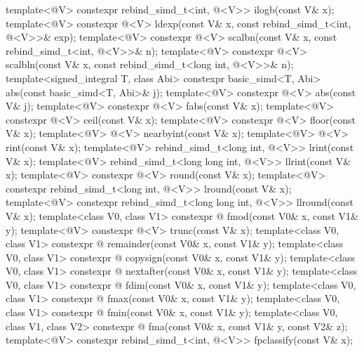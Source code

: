 \begin{itemdecl}
template<@\mathfloatingpoint@ V> constexpr rebind_simd_t<int, @\deducedsimd@<V>> ilogb(const V& x);
template<@\mathfloatingpoint@ V> constexpr @\deducedsimd@<V> ldexp(const V& x, const
rebind_simd_t<int, @\deducedsimd@<V>>& exp);
template<@\mathfloatingpoint@ V> constexpr @\deducedsimd@<V> scalbn(const V& x, const
rebind_simd_t<int, @\deducedsimd@<V>>& n);
template<@\mathfloatingpoint@ V>
  constexpr @\deducedsimd@<V> scalbln(const V& x, const rebind_simd_t<long int, @\deducedsimd@<V>>& n);
template<signed_integral T, class Abi>
  constexpr basic_simd<T, Abi> abs(const basic_simd<T, Abi>& j);
template<@\mathfloatingpoint@ V> constexpr @\deducedsimd@<V> abs(const V& j);
template<@\mathfloatingpoint@ V> constexpr @\deducedsimd@<V> fabs(const V& x);
template<@\mathfloatingpoint@ V> constexpr @\deducedsimd@<V> ceil(const V& x);
template<@\mathfloatingpoint@ V> constexpr @\deducedsimd@<V> floor(const V& x);
template<@\mathfloatingpoint@ V> @\deducedsimd@<V> nearbyint(const V& x);
template<@\mathfloatingpoint@ V> @\deducedsimd@<V> rint(const V& x);
template<@\mathfloatingpoint@ V> rebind_simd_t<long int, @\deducedsimd@<V>> lrint(const V& x);
template<@\mathfloatingpoint@ V> rebind_simd_t<long long int, @\deducedsimd@<V>> llrint(const V& x);
template<@\mathfloatingpoint@ V> constexpr @\deducedsimd@<V> round(const V& x);
template<@\mathfloatingpoint@ V> constexpr rebind_simd_t<long int, @\deducedsimd@<V>> lround(const V& x);
template<@\mathfloatingpoint@ V> constexpr rebind_simd_t<long long int, @\deducedsimd@<V>> llround(const V& x);
template<class V0, class V1>
  constexpr @ fmod(const V0& x, const V1& y);
template<@\mathfloatingpoint@ V> constexpr @\deducedsimd@<V> trunc(const V& x);
template<class V0, class V1>
  constexpr @ remainder(const V0& x, const V1& y);
template<class V0, class V1>
  constexpr @ copysign(const V0& x, const V1& y);
template<class V0, class V1>
  constexpr @ nextafter(const V0& x, const V1& y);
template<class V0, class V1>
  constexpr @ fdim(const V0& x, const V1& y);
template<class V0, class V1>
  constexpr @ fmax(const V0& x, const V1& y);
template<class V0, class V1>
  constexpr @ fmin(const V0& x, const V1& y);
template<class V0, class V1, class V2>
  constexpr @ fma(const V0& x, const V1& y, const V2& z);
template<@\mathfloatingpoint@ V> constexpr rebind_simd_t<int, @\deducedsimd@<V>> fpclassify(const V& x);

\end{itemdecl}
